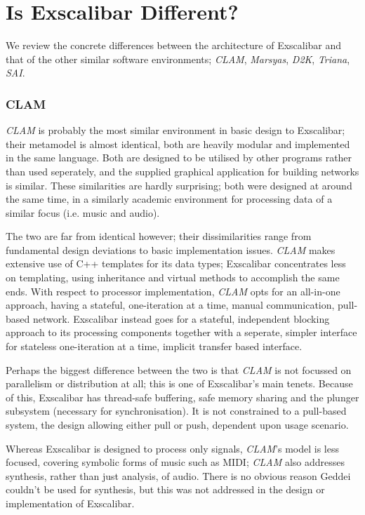 \section{Is Exscalibar Different?}

We review the concrete differences between the architecture of Exscalibar and that of the other similar software environments; \textit{CLAM}, \textit{Marsyas}, \textit{D2K}, \textit{Triana}, \textit{SAI}.

\subsubsection{CLAM}

\textit{CLAM} is probably the most similar environment in basic design to Exscalibar; their metamodel is almost identical, both are heavily modular and implemented in the same language. Both are designed to be utilised by other programs rather than used seperately, and the supplied graphical application for building networks is similar. These similarities are hardly surprising; both were designed at around the same time, in a similarly academic environment for processing data of a similar focus (i.e. music and audio).

The two are far from identical however; their dissimilarities range from fundamental design deviations to basic implementation issues. \textit{CLAM} makes extensive use of C++ templates for its data types; Exscalibar concentrates less on templating, using inheritance and virtual methods to accomplish the same ends. With respect to processor implementation, \textit{CLAM} opts for an all-in-one approach, having a stateful, one-iteration at a time, manual communication, pull-based network. Exscalibar instead goes for a stateful, independent blocking approach to its processing components together with a seperate, simpler interface for stateless one-iteration at a time, implicit transfer based interface.

Perhaps the biggest difference between the two is that \textit{CLAM} is not focussed on parallelism or distribution at all; this is one of Exscalibar's main tenets. Because of this, Exscalibar has thread-safe buffering, safe memory sharing and the plunger subsystem (necessary for synchronisation). It is not constrained to a pull-based system, the design allowing either pull or push, dependent upon usage scenario.

Whereas Exscalibar is designed to process only signals, \textit{CLAM}'s model is less focused, covering symbolic forms of music such as MIDI; \textit{CLAM} also addresses synthesis, rather than just analysis, of audio. There is no obvious reason Geddei couldn't be used for synthesis, but this was not addressed in the design or implementation of Exscalibar.

